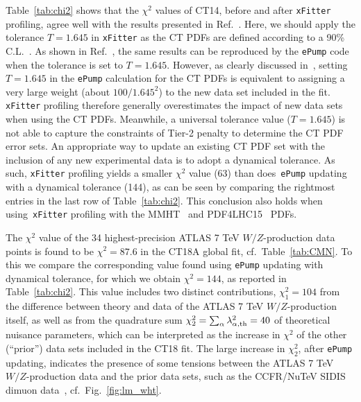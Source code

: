 Table~\ref{tab:chi2} shows that the $\chi^{2}$ values of CT14, before and after \texttt{xFitter} profiling, agree well with the results presented in Ref.~\cite{Aaboud:2016btc}.
Here, we should apply the tolerance $T=1.645$ in \texttt{xFitter} as the CT PDFs are defined according to a 90\%
C.L.~\cite{Dulat:2015mca,Hou:2016nqm}.
As shown in Ref.~\cite{Hou:2019gfw}, the same results can be reproduced by the \texttt{ePump}
code when the tolerance is set to $T\! =\! 1.645$. However, as clearly discussed in~\cite{Hou:2019gfw}, setting $T=1.645$ in the \texttt{ePump} calculation for the CT PDFs is equivalent to
assigning a very large weight (about $100/1.645^2$) to the new data set included in the fit.
\texttt{xFitter} profiling therefore generally overestimates the impact of new data sets when using the CT PDFs.
Meanwhile, a universal tolerance value ($T=1.645$) is not able to capture the constraints of Tier-2 penalty to determine the CT PDF error sets.
An appropriate way to update an existing CT PDF set with the
inclusion of any new experimental data is to adopt a dynamical tolerance.
As such, \texttt{xFitter} profiling yields a smaller $\chi^2$ value (63) than
does~\texttt{ePump} updating with a dynamical tolerance (144), as can be seen by comparing the rightmost entries in the last row of Table~\ref{tab:chi2}.
This conclusion also holds when using~\texttt{xFitter} profiling with the MMHT~\cite{Harland-Lang:2014zoa} and PDF4LHC15~\cite{Butterworth:2015oua} PDFs.

The $\chi^2$ value of the 34 highest-precision ATLAS 7 TeV $W/Z$-production data points is found to be $\chi^2\!=\!87.6$ in the CT18A global fit, cf.~Table~\ref{tab:CMN}.
To this we compare the corresponding value found using \texttt{ePump} updating with dynamical tolerance, for which we obtain $\chi^2\!=\!144$, as reported in Table~\ref{tab:chi2}.
This value includes two distinct contributions, $\chi^2_1=104$ from the difference between theory and data of the ATLAS 7 TeV $W/Z$-production itself, as well as from the quadrature sum $\chi^2_2=\sum_\alpha \lambda_{\alpha,\rm{th}}^2=40$ of theoretical nuisance parameters, which can be interpreted as the increase in $\chi^2$ of the other (``prior'') data sets included in the CT18 fit. 
The large increase in $\chi^2_2$, after \texttt{ePump} updating,  indicates the presence of some tensions between the ATLAS 7 TeV $W/Z$-production
data and the prior data sets, such as the CCFR/NuTeV SIDIS dimuon data~\cite{Hou:2019gfw}, cf.~Fig.~\ref{fig:lm_wht}.


